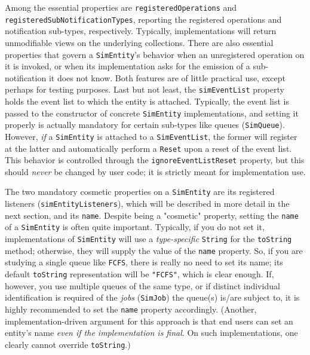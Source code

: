 \begin{sloppypar}
Among the essential properties are
  \lstinline|registeredOperations|
  and
  \lstinline|registeredSubNotificationTypes|,
  reporting the registered operations and notification sub-types,
  respectively.
Typically,
  implementations will return unmodifiable views
  on the underlying collections.
There are also essential properties that govern a
  \lstinline|SimEntity|'s behavior when an
  unregistered operation on it is invoked,
  or when its implementation asks for the emission
  of a sub-notification it does not know.
Both features are of little practical use,
  except perhaps for testing purposes.
Last but not least,
  the \lstinline|simEventList| property holds
  the event list to which the entity is attached.
Typically,
  the event list is passed to the constructor
  of concrete \lstinline|SimEntity| implementations,
  and setting it properly is actually mandatory
  for certain sub-types
  like queues (\lstinline|SimQueue|).
However, {\em if\/} a \lstinline|SimEntity| is attached to a
  \lstinline|SimEventList|,
  the former will register at the latter
  and automatically perform a \lstinline|Reset|
  upon a reset of the event list.
This behavior
  is controlled through the \lstinline|ignoreEventListReset|
  property, but this should {\em never\/}
  be changed by user code; it is strictly meant for
  implementation use.
\end{sloppypar}
  
\begin{sloppypar}
The two mandatory cosmetic properties on a \lstinline|SimEntity|
  are its registered listeners (\lstinline|simEntityListeners|),
  which will be described in more detail in the next section,
  and its \lstinline|name|.
Despite being a "cosmetic" property,
  setting the \lstinline|name|
  of a \lstinline|SimEntity|
  is often quite important.
Typically,
  if you do not set it,
  implementations of \lstinline|SimEntity|
  will use a {\em type-specific\/}
  \lstinline|String|
  for the \lstinline|toString| method;
  otherwise,
  they will supply the value of the \lstinline|name|
  property.
So,
  if you are studying a single queue like \lstinline|FCFS|,
  there is really no need to set its name;
  its default \lstinline|toString| representation
  will be \lstinline|"FCFS"|,
  which is clear enough.
If, however,
  you use multiple queues of the same type,
  or if distinct individual identification is required
  of the {\em jobs\/} (\lstinline|SimJob|)
  the queue(s) is/are subject to,
  it is highly recommended to set the
  \lstinline|name| property accordingly.
(Another, implementation-driven argument for this approach
  is that end users can set an entity's name
  {\em even if the implementation is final}.
On such implementations,
  one clearly cannot override \lstinline|toString|.)
\end{sloppypar}
  
